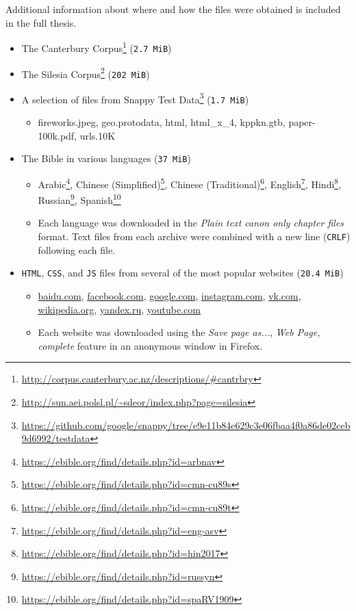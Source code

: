 \documentclass[english,master,dept460,male,cpp,cpdeclaration]{diploma}
\newcommand{\nosep}{\itemsep0em}
\begin{document}
	\noindent
	Additional information about where and how the files were obtained is included in the full thesis.
	
	\else %
	
	\begin{itemize} \nosep
		\item The Canterbury Corpus\footnote{\url{http://corpus.canterbury.ac.nz/descriptions/\#cantrbry}} (\verb|2.7 MiB|)
		\item The Silesia Corpus\footnote{\url{http://sun.aei.polsl.pl/~sdeor/index.php?page=silesia}} (\verb|202 MiB|)
		\item A selection of files from Snappy Test Data\footnote{\url{https://github.com/google/snappy/tree/e9e11b84e629c3e06fbaa4f0a86de02ceb9d6992/testdata}} (\verb|1.7 MiB|)
		\begin{itemize} \nosep
			\item fireworks.jpeg, geo.protodata, html, html\_x\_4, kppkn.gtb, paper-100k.pdf, urls.10K
		\end{itemize}
		\item The Bible in various languages (\verb|37 MiB|)
		\begin{itemize} \nosep
			\item Arabic\footnote{\url{https://ebible.org/find/details.php?id=arbnav}},
			      Chinese (Simplified)\footnote{\url{https://ebible.org/find/details.php?id=cmn-cu89s}},
			      Chinese (Traditional)\footnote{\url{https://ebible.org/find/details.php?id=cmn-cu89t}},
			      English\footnote{\url{https://ebible.org/find/details.php?id=eng-asv}},
			      Hindi\footnote{\url{https://ebible.org/find/details.php?id=hin2017}},
			      Russian\footnote{\url{https://ebible.org/find/details.php?id=russyn}},
			      Spanish\footnote{\url{https://ebible.org/find/details.php?id=spaRV1909}}
			\item Each language was downloaded in the \emph{Plain text canon only chapter files} format. Text files from each archive were combined with a new line (\verb|CRLF|) following each file.
		\end{itemize}
		\item \verb|HTML|, \verb|CSS|, and \verb|JS| files from several of the most popular websites (\verb|20.4 MiB|)
		\begin{itemize} \nosep
			\item \url{baidu.com}, \url{facebook.com}, \url{google.com}, \url{instagram.com}, \url{vk.com}, \url{wikipedia.org}, \url{yandex.ru}, \url{youtube.com}
			\item Each website was downloaded using the \emph{Save page as...}, \emph{Web Page, complete} feature in an anonymous window in Firefox.
		\end{itemize}
	\end{itemize}
	
\end{document}
